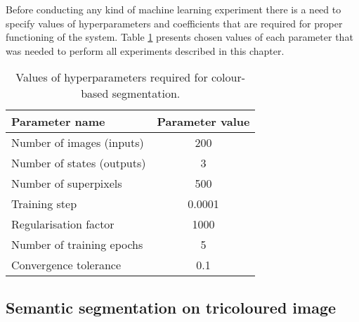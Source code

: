 Before conducting any kind of machine learning experiment there is a need to specify values of hyperparameters and coefficients that are required for proper functioning of the system. Table \ref{table:hyperparameters_linear} presents chosen values of each parameter that was needed to perform all experiments described in this chapter.
\begin{table}[ht]
    \caption{Values of hyperparameters required for colour-based segmentation.}
    \centering
    \begin{tabular}{|l|c|}
        \hline
        \rowcolor[HTML]{cecaca} 
        \textbf{Parameter name} & \textbf{Parameter value} \\ \hline
        Number of images (inputs) & 200 \\ \hline
        Number of states (outputs) & 3 \\ \hline
        Number of superpixels & 500 \\ \hline
        Training step & 0.0001 \\ \hline
        Regularisation factor & 1000 \\ \hline
        Number of training epochs & 5 \\ \hline
        Convergence tolerance & 0.1 \\ \hline
    \end{tabular}
    \label{table:hyperparameters_linear}
\end{table}

\subsection{Semantic segmentation on tricoloured image}

